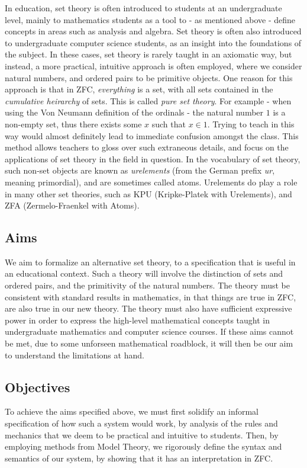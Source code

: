 \documentclass[12pt]{article}
\theoremstyle{definition}
\begin{document}
In education, set theory is often introduced to students at an undergraduate level, mainly to mathematics students as a tool to - as mentioned above - define concepts in areas such as analysis and algebra.
Set theory is often also introduced to undergraduate computer science students, as an insight into the foundations of the subject.
In these cases, set theory is rarely taught in an axiomatic way, but instead, a more practical, intuitive approach is often employed, where we consider natural numbers, and ordered pairs to be primitive objects.
One reason for this approach is that in ZFC, \emph{everything} is a set, with all sets contained in the \emph{cumulative heirarchy} of sets.
This is called \emph{pure set theory}.
For example - when using the Von Neumann definition of the ordinals - the natural number $1$ is a non-empty set, thus there exists some $x$ such that $x\in 1$.
Trying to teach in this way would almost definitely lead to immediate confusion amongst the class.
This method allows teachers to gloss over such extraneous details, and focus on the applications of set theory in the field in question.
In the vocabulary of set theory, such non-set objects are known as \emph{urelements} (from the German prefix \emph{ur}, meaning primordial), and are sometimes called atoms.
Urelements do play a role in many other set theories, such as KPU (Kripke-Platek with Urelements), and ZFA (Zermelo-Fraenkel with Atoms).

\subsection{Aims}
We aim to formalize an alternative set theory, to a specification that is useful in an educational context.
Such a theory will involve the distinction of sets and ordered pairs, and the primitivity of the natural numbers.
The theory must be consistent with standard results in mathematics, in that things are true in ZFC, are also true in our new theory.
The theory must also have sufficient expressive power in order to express the high-level mathematical concepts taught in undergraduate mathematics and computer science courses.
If these aims cannot be met, due to some unforseen mathematical roadblock, it will then be our aim to understand the limitations at hand.

\subsection{Objectives}
To achieve the aims specified above, we must first solidify an informal specification of how such a system would work, by analysis of the rules and mechanics that we deem to be practical and intuitive to students.
Then, by employing methods from Model Theory, we rigorously define the syntax and semantics of our system, by showing that it has an interpretation in ZFC.
\end{document}
